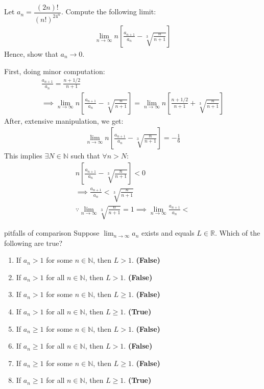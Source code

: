 \documentclass[12pt]{book}
\theoremstyle{definition}
\begin{document}
\begin{ex}{2.19} Let $a_n = \dfrac{(2n)!}{(n!)^24^n}$. Compute the following limit:
\begin{align*}
\lim_{n \to \infty} n \left[ \frac{a_{n+1}}{a_n} - \sqrt[3]{\frac{n}{n+1} } \right]	
\end{align*}
Hence, show that $a_n \to 0$.
\end{ex}

\begin{sol}
First, doing minor computation:
\begin{align*}
\frac{a_{n+1}}{a_n}= \frac{n+1/2}{n+1}\\
\implies 	\lim_{n \to \infty} n \left[ \frac{a_{n+1}}{a_n} - \sqrt[3]{\frac{n}{n+1} } \right]	 = \lim_{n \to \infty}n\left[ \frac{n+1/2}{n+1} + \sqrt[3]{\frac{n}{n+1} }\right]
\end{align*}
After, extensive manipulation, we get:
\begin{align*}
	\lim_{n \to \infty} n \left[ \frac{a_{n+1}}{a_n} - \sqrt[3]{\frac{n}{n+1} } \right] = -\frac{1}{6}
\end{align*}
This implies $\exists N \in \mathbb{N}$ such that $\forall n > N$:
\begin{align*}
	n \left[ \frac{a_{n+1}}{a_n} - \sqrt[3]{\frac{n}{n+1} } \right] <0 \\
	\implies \frac{a_{n+1}}{a_n} < \sqrt[3]{\frac{n}{n+1}} \\
	\because \lim_{n \to \infty} \sqrt[3]{\frac{n}{n+1}} = 1 \implies \lim_{n \to \infty} \frac{a_{n+1}}{a_n} <  
\end{align*} 
\end{sol}



\begin{ex}{pitfalls of comparison}
Suppose $ \lim_{n\to \infty} a_n$ exists and equals $L \in \mathbb{R}$. Which of the following are true?
\begin{enumerate}[label=(\alph*)]
	\item If $a_n >1$ for some $n \in \mathbb{N}$, then $L>1$. \textbf{(False)}
	\item If $a_n>1$ for all $n \in \mathbb{N}$, then $L>1$. \textbf{(False)}
	\item If $a_n>1$ for some $n \in \mathbb{N}$, then $L\geq 1$. \textbf{(False)}
	\item If $a_n>1$ for all $n \in \mathbb{N}$, then $L\geq 1$.  \textbf{(True)}
	\item If $a_n \geq 1$ for some $n \in \mathbb{N}$, then $L>1$.  \textbf{(False)}
	\item If $a_n \geq 1$ for all $n \in \mathbb{N}$, then $L>1$.  \textbf{(False)}
	\item If $a_n \geq 1$ for some $n \in \mathbb{N}$, then $L\geq 1$. \textbf{(False)}
	\item If $a_n \geq 1$ for all $n \in \mathbb{N}$, then $L \geq 1$. \textbf{(True)}
\end{enumerate}
\end{ex}
\end{document}
